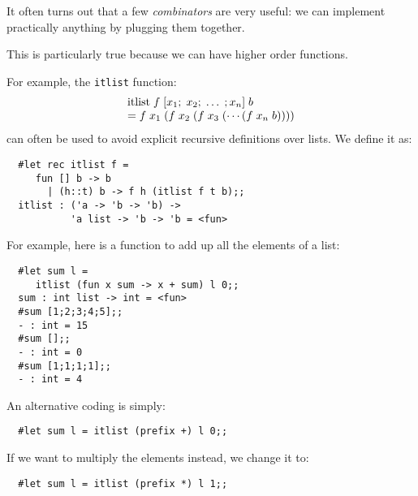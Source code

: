 \begin{slide*}


\vspace*{0.5cm}

It often turns out that a few {\em combinators} are very useful: we can
implement practically anything by plugging them together.

This is particularly true because we can have higher order functions.

For example, the {\black \tt itlist} function:
{\red $$ \begin{array}[t]{l} \mbox{itlist}\; f\; [x_1;\; x_2;\; \ldots \;; x_n]\; b\\ =
f\; x_1\; (f\; x_2\; (f\; x_3\; ( \cdots (f\; x_n\; b)))) \end{array}$$}
can often be used to avoid explicit recursive definitions over lists. We define
it as:

\begin{black}\begin{verbatim}
  #let rec itlist f =
     fun [] b -> b
       | (h::t) b -> f h (itlist f t b);;
  itlist : ('a -> 'b -> 'b) ->
           'a list -> 'b -> 'b = <fun>
\end{verbatim}\end{black}

\end{slide*}



\begin{slide*}


\vspace*{0.5cm}

For example, here is a function to add up all the elements of a list:

\begin{black}\begin{verbatim}
  #let sum l =
     itlist (fun x sum -> x + sum) l 0;;
  sum : int list -> int = <fun>
  #sum [1;2;3;4;5];;
  - : int = 15
  #sum [];;
  - : int = 0
  #sum [1;1;1;1];;
  - : int = 4
\end{verbatim}\end{black}

An alternative coding is simply:

\begin{black}\begin{verbatim}
  #let sum l = itlist (prefix +) l 0;;
\end{verbatim}\end{black}

If we want to multiply the elements instead, we change it to:

\begin{black}\begin{verbatim}
  #let sum l = itlist (prefix *) l 1;;
\end{verbatim}\end{black}

\end{slide*}




